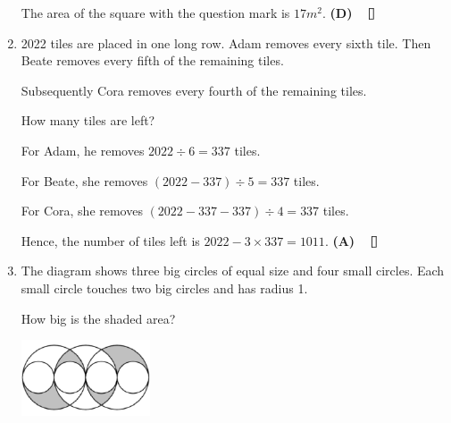 \documentclass{report}
\begin{document}
\begin{multicols}{2}
\begin{enumerate}
              The area of the square with the question mark is $17\textit{m}^2$. \textbf{(D)}
              $\eos$

        \item 2022 tiles are placed in one long row. Adam removes every sixth tile. Then Beate removes every fifth of the remaining tiles.

              Subsequently Cora removes every fourth of the remaining tiles.

              How many tiles are left?

              \sol{}

              For Adam, he removes $2022 \div 6 = 337$ tiles.

              For Beate, she removes $(2022 - 337) \div 5 = 337$ tiles.

              For Cora, she removes $(2022 - 337 - 337) \div 4 = 337$ tiles.

              Hence, the number of tiles left is $2022 - 3 \times 337= 1011$. \textbf{(A)}
              $\eos$

        \item The diagram shows three big circles of equal size and four small circles. Each
              small circle touches two big circles and has radius 1.

              How big is the shaded area?
              \begin{center}
                  \includegraphics[width=0.3\textwidth]{pictures/10.png}
              \end{center}

              \sol{}


\end{enumerate}
\end{multicols}
\end{document}
